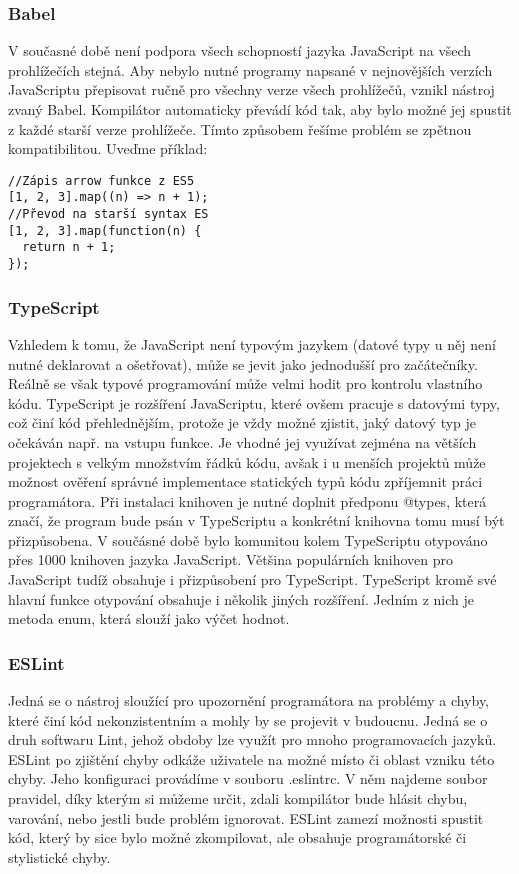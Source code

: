 \subsubsection{Babel}
V současné době není podpora všech schopností jazyka JavaScript na všech prohlížečích stejná. Aby nebylo nutné programy napsané v nejnovějších verzích JavaScriptu přepisovat ručně pro všechny verze všech prohlížečů, vznikl nástroj zvaný Babel. Kompilátor automaticky převádí kód tak, aby bylo možné jej spustit z každé starší verze prohlížeče. Tímto způsobem řešíme problém se zpětnou kompatibilitou. \cite{babel} Uveďme příklad:

\begin{lstlisting}
//Zápis arrow funkce z ES5
[1, 2, 3].map((n) => n + 1); 
//Převod na starší syntax ES
[1, 2, 3].map(function(n) { 
  return n + 1;
}); 
\end{lstlisting}

\subsubsection{TypeScript}
Vzhledem k tomu, že JavaScript není typovým  jazykem (datové typy u něj není nutné deklarovat a ošetřovat), může se jevit jako jednodušší pro začátečníky. Reálně se však typové programování může velmi hodit pro kontrolu vlastního kódu. TypeScript je rozšíření JavaScriptu, které ovšem pracuje s datovými typy, což činí kód přehlednějším, protože je vždy možné zjistit, jaký datový typ je očekáván např. na vstupu funkce. Je vhodné jej využívat zejména na větších projektech s velkým množstvím řádků kódu, avšak i u menších projektů může možnost ověření správné implementace statických typů kódu zpříjemnit práci programátora. Při instalaci knihoven je nutné doplnit předponu @types, která značí, že program bude psán v TypeScriptu a konkrétní knihovna tomu musí být přizpůsobena. V součásné době bylo komunitou kolem TypeScriptu otypováno přes 1000 knihoven jazyka JavaScript. Většina populárních knihoven pro JavaScript tudíž obsahuje i přizpůsobení pro TypeScript. TypeScript kromě své hlavní funkce otypování obsahuje i několik jiných rozšíření. Jedním z nich je metoda enum, která slouží jako výčet hodnot.\cite{TypeScript}

\subsubsection{ESLint}
Jedná se o nástroj sloužící pro upozornění programátora na problémy a chyby, které činí kód nekonzistentním a mohly by se projevit v budoucnu. Jedná se o druh softwaru Lint, jehož obdoby lze využít pro mnoho programovacích jazyků. ESLint po zjištění chyby odkáže uživatele na možné místo či oblast vzniku této chyby. Jeho konfiguraci provádíme v souboru .eslintrc. V něm najdeme soubor pravidel, díky kterým si můžeme určit, zdali kompilátor bude hlásit chybu, varování, nebo jestli bude problém ignorovat. ESLint zamezí možnosti spustit kód, který by sice bylo možné zkompilovat, ale obsahuje programátorské či stylistické chyby. \cite{ESLint}

